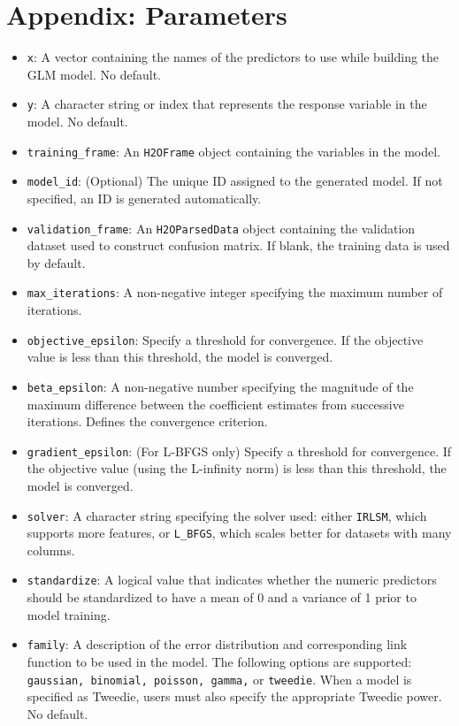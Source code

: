 \section{Appendix: Parameters}
\begin{itemize}
\item \texttt{x}: A vector containing the names of the predictors to use while building the GLM model. No default.
\item \texttt{y}: A character string or index that represents the response variable in the model. No default.
\item \texttt{training\_frame}: An \texttt{H2OFrame} object containing the variables in the model. 
\item \texttt{model\_id}: (Optional) The unique ID assigned to the generated model. If not specified, an ID is generated automatically.
\item \texttt{validation\_frame}: An \texttt{H2OParsedData} object containing the validation dataset used to construct confusion matrix. If  blank, the training data is used by default.
\item \texttt{max\_iterations}: A non-negative integer specifying the maximum number of iterations. 
\item \texttt{objective\_epsilon}: Specify a threshold for convergence. If the objective value is less than this threshold, the model is converged.
\item \texttt{beta\_epsilon}: A non-negative number specifying the magnitude of the maximum difference between the coefficient estimates from successive iterations. Defines the convergence criterion. 
\item \texttt{gradient\_epsilon}: (For L-BFGS only) Specify a threshold for convergence. If the objective value (using the L-infinity norm) is less than this threshold, the model is converged.
\item \texttt{solver}: A character string specifying the solver used: either \texttt{IRLSM}, which supports more features, or \texttt{L\_BFGS}, which scales better for datasets with many columns. 
\item \texttt{standardize}: A logical value that indicates whether the numeric predictors should be standardized to have a mean of 0 and a variance of 1 prior to model training. 
\item \texttt{family}: A description of the error distribution and corresponding link function to be used in the model. The following options are supported: \texttt{gaussian, binomial, poisson, gamma,} or \texttt{tweedie}. When a model is specified as Tweedie, users must also specify the appropriate Tweedie power. No default. %

\end{itemize}
